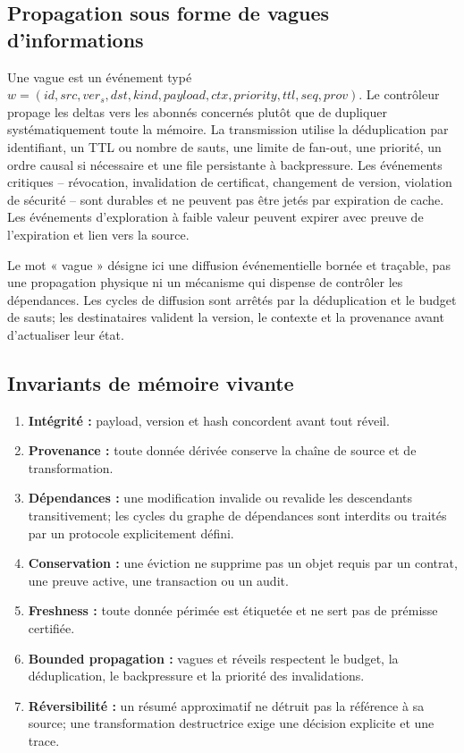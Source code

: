 \documentclass[11pt,a4paper]{article}
\theoremstyle{definition}
\theoremstyle{plain}
\theoremstyle{remark}
\begin{document}
\subsection{Propagation sous forme de vagues d'informations}
Une vague est un événement typé \(w=(id,src,ver_s,dst,kind,payload,ctx,priority,ttl,seq,prov)\). Le contrôleur propage les deltas vers les abonnés concernés plutôt que de dupliquer systématiquement toute la mémoire. La transmission utilise la déduplication par identifiant, un TTL ou nombre de sauts, une limite de fan-out, une priorité, un ordre causal si nécessaire et une file persistante à backpressure. Les événements critiques -- révocation, invalidation de certificat, changement de version, violation de sécurité -- sont durables et ne peuvent pas être jetés par expiration de cache. Les événements d'exploration à faible valeur peuvent expirer avec preuve de l'expiration et lien vers la source.

Le mot « vague » désigne ici une diffusion événementielle bornée et traçable, pas une propagation physique ni un mécanisme qui dispense de contrôler les dépendances. Les cycles de diffusion sont arrêtés par la déduplication et le budget de sauts; les destinataires valident la version, le contexte et la provenance avant d'actualiser leur état.

\subsection{Invariants de mémoire vivante}
\begin{enumerate}
\item \textbf{Intégrité :} payload, version et hash concordent avant tout réveil.
\item \textbf{Provenance :} toute donnée dérivée conserve la chaîne de source et de transformation.
\item \textbf{Dépendances :} une modification invalide ou revalide les descendants transitive­ment; les cycles du graphe de dépendances sont interdits ou traités par un protocole explicitement défini.
\item \textbf{Conservation :} une éviction ne supprime pas un objet requis par un contrat, une preuve active, une transaction ou un audit.
\item \textbf{Freshness :} toute donnée périmée est étiquetée et ne sert pas de prémisse certifiée.
\item \textbf{Bounded propagation :} vagues et réveils respectent le budget, la déduplication, le backpressure et la priorité des invalidations.
\item \textbf{Réversibilité :} un résumé approximatif ne détruit pas la référence à sa source; une transformation destructrice exige une décision explicite et une trace.
\end{enumerate}
\end{document}
